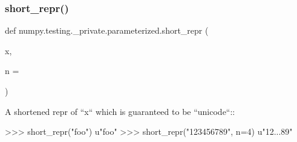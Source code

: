 \subsubsection{\texorpdfstring{short\+\_\+repr()}{short\_repr()}}
{\footnotesize\ttfamily def numpy.\+testing.\+\_\+private.\+parameterized.\+short\+\_\+repr (\begin{DoxyParamCaption}\item[{}]{x,  }\item[{}]{n = {} }\end{DoxyParamCaption})}

\begin{DoxyVerb}A shortened repr of ``x`` which is guaranteed to be ``unicode``::

        >>> short_repr("foo")
        u"foo"
        >>> short_repr("123456789", n=4)
        u"12...89"
\end{DoxyVerb}
 